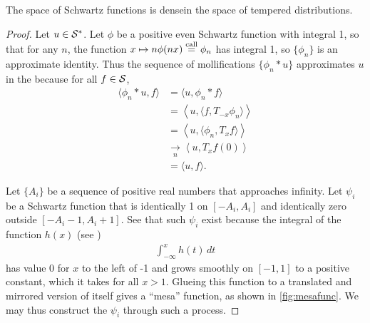     \begin{thm}
      \label{thm:sdenseinss}
      The space of Schwartz functions is dense\footnotemark in the space of tempered distributions.
    \end{thm}
    \begin{proof}
      Let $u\in\SS$.
      Let $\phi$ be a positive even Schwartz function with integral 1, so that for any $n$, the function $x\mapsto n\phi(nx) \call \phi_n$ has integral 1, so $\{\phi_n\}$ is an approximate identity.
      Thus the sequence of mollifications $\{\phi_n*u\}$ approximates $u$ in the \ws because for all $f\in\S$, 
      \begin{align*}
        \langle \phi_n*u, f\rangle
        &= \langle u, \phi_n*f\rangle
        \\&= \left\langle u, \langle f, T_{-x}\phi_n\rangle \right\rangle
        \\&= \left\langle u, \langle \phi_n, T_{x}f\rangle \right\rangle
        \\&\underset{n}{\longrightarrow} \left\langle u, T_xf(0) \right\rangle
        \\&= \langle u,f\rangle \text{.}
      \end{align*}

      Let $\{A_i\}$ be a sequence of positive real numbers that approaches infinity.
      Let $\psi_i$ be a Schwartz function that is identically 1 on $[-A_i,A_i]$ and identically zero outside $[-A_i-1,A_i+1]$.
      See that such $\psi_i$ exist because the integral of the function $h(x)$ (see )
      \begin{align*}
        \int_{-\infty}^x h(t)\,dt
      \end{align*}
      has value 0 for $x$ to the left of -1 and grows smoothly on $[-1,1]$ to a positive constant, which it takes for all $x>1$.
      Glueing this function to a translated and mirrored version of itself gives a ``mesa'' function, as shown in \cref{fig:mesafunc}.
      We may thus construct the $\psi_i$ through such a process.


\end{proof}
